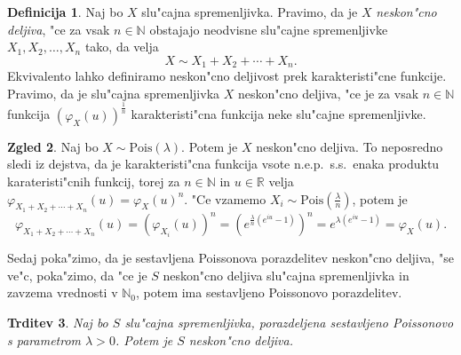 \documentclass[12pt, a4paper, reqno]{amsart}
\theoremstyle{definition}
\newtheorem{definicija}{Definicija}[section]
\newtheorem{zgled}[definicija]{Zgled}
\theoremstyle{plain}
\newtheorem{trditev}[definicija]{Trditev}
\newcommand{\R}{\mathbb{R}}
\newcommand{\N}{\mathbb{N}}
\newcommand{\1}{\mathds{1}}
\begin{document}
    \begin{definicija}
        Naj bo $X$ slu"cajna spremenljivka. Pravimo, da je $X$ \textit{neskon"cno deljiva}, "ce za vsak $n\in\N$
        obstajajo neodvisne slu"cajne spremenljivke $X_1, X_2, \dots, X_n$ tako, da velja
        \begin{equation*}
            X \sim X_1 + X_2 + \cdots + X_n.
        \end{equation*}
        Ekvivalento lahko definiramo neskon"cno deljivost prek karakteristi"cne funkcije. Pravimo, da je
        slu"cajna spremenljivka $X$ neskon"cno deljiva, "ce je za vsak $n\in\N$ funkcija 
        $\left(\varphi_X(u)\right)^{\frac{1}{n}}$ karakteristi"cna funkcija neke slu"cajne spremenljivke.
    \end{definicija}

    \begin{zgled}
        Naj bo $X\sim \text{Pois}(\lambda)$. Potem je $X$ neskon"cno deljiva. To neposredno sledi 
        iz dejstva, da je karakteristi"cna funkcija vsote n.e.p.\ s.s.\ enaka produktu karateristi"cnih 
        funkcij, torej za $n\in\N$ in $u\in\R$ velja $\varphi_{X_1 + X_2 + \cdots + X_n}(u) = \varphi_X(u)^n$. 
        "Ce vzamemo $X_i \sim \text{Pois}(\tfrac{\lambda}{n})$, potem je 
        \begin{equation*}
        \varphi_{X_1 + X_2 + \cdots + X_n}(u) = 
        \left(\varphi_{X_i}(u)\right)^n = \left(e^{\tfrac{\lambda}{n}(e^{iu} - 1)}\right)^n = e^{\lambda(e^{iu} - 1)} = \varphi_X(u).
        \end{equation*}
    \end{zgled}

    Sedaj poka"zimo, da je sestavljena Poissonova porazdelitev neskon"cno deljiva, "se ve"c, poka"zimo, 
    da "ce je $S$ neskon"cno deljiva slu"cajna spremenljivka in zavzema vrednosti v $\N_0$, 
    potem ima sestavljeno Poissonovo porazdelitev.

    \begin{trditev}
        Naj bo $S$ slu"cajna spremenljivka, porazdeljena sestavljeno Poissonovo s parametrom $\lambda > 0$.
        Potem je $S$ neskon"cno deljiva.
        \label{trd:CPDneskoncnoDeljiva}
    \end{trditev}
\end{document}
